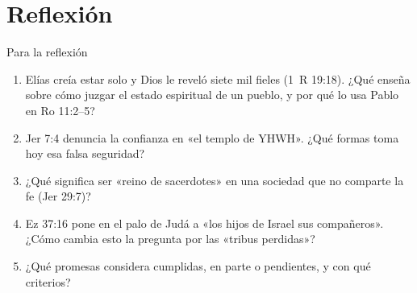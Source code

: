 \documentclass[hyperref={bookmarks=false},aspectratio=169]{beamer}
\begin{document}
\section{Reflexión}
\begin{frame}{Para la reflexión}
\small
\begin{enumerate}\setlength{\itemsep}{5pt}
\item Elías creía estar solo y Dios le reveló siete mil fieles (1~R 19:18). ¿Qué enseña sobre cómo juzgar el estado espiritual de un pueblo, y por qué lo usa Pablo en Ro 11:2--5?
\item Jer 7:4 denuncia la confianza en «el templo de YHWH». ¿Qué formas toma hoy esa falsa seguridad?
\item ¿Qué significa ser «reino de sacerdotes» en una sociedad que no comparte la fe (Jer 29:7)?
\item Ez 37:16 pone en el palo de Judá a «los hijos de Israel sus compañeros». ¿Cómo cambia esto la pregunta por las «tribus perdidas»?
\item ¿Qué promesas considera cumplidas, en parte o pendientes, y con qué criterios?
\end{enumerate}
\end{frame}

\end{document}

